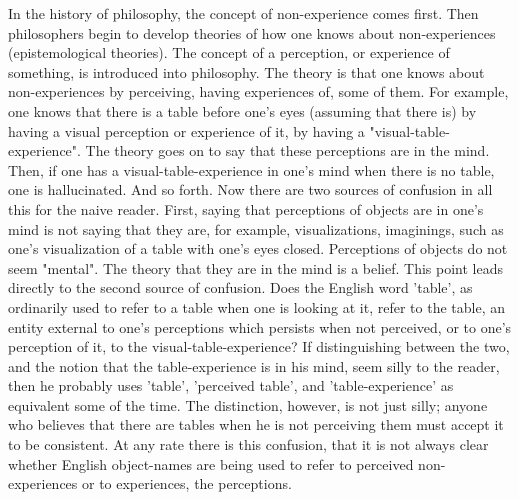 \documentclass[10pt,twoside,draft]{memoir}
\begin{document}
In the history of philosophy, the concept of non-experience comes first. 
Then philosophers begin to develop theories of how one knows about 
non-experiences (epistemological theories). The concept of a perception, or 
experience of something, is introduced into philosophy. The theory is that 
one knows about non-experiences by perceiving, having experiences of, some 
of them. For example, one knows that there is a table before one's eyes 
(assuming that there is) by having a visual perception or experience of it, by 
having a "visual-table-experience". The theory goes on to say that these 
perceptions are in the mind. Then, if one has a visual-table-experience in 
one's mind when there is no table, one is hallucinated. And so forth. Now 
there are two sources of confusion in all this for the naive reader. First, 
saying that perceptions of objects are in one's mind is not saying that they 
are, for example, visualizations, imaginings, such as one's visualization of a 
table with one's eyes closed. Perceptions of objects do not seem "mental". 
The theory that they are in the mind is a belief. This point leads directly to 
the second source of confusion. Does the English word 'table', as ordinarily 
used to refer to a table when one is looking at it, refer to the table, an entity 
external to one's perceptions which persists when not perceived, or to one's 
perception of it, to the visual-table-experience? If distinguishing between 
the two, and the notion that the table-experience is in his mind, seem silly to 
the reader, then he probably uses 'table', 'perceived table', and 
'table-experience' as equivalent some of the time. The distinction, however, 
is not just silly; anyone who believes that there are tables when he is not 
perceiving them must accept it to be consistent. At any rate there is this 
confusion, that it is not always clear whether English object-names are being 
used to refer to perceived non-experiences or to experiences, the 
perceptions. 
\end{document}
